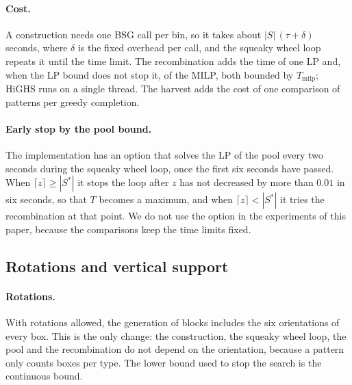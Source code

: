 \paragraph{Cost.}
A construction needs one BSG call per bin, so it takes about $|S|\,(\tau+\delta)$ seconds, where
$\delta$ is the fixed overhead per call, and the squeaky wheel loop repeats it until the time
limit. The recombination adds the time of one LP and, when the LP bound does not stop it, of the
MILP, both bounded by $T_{\mathrm{milp}}$; HiGHS \citep{Huangfu2018} runs on a single thread.
The harvest adds the cost of one comparison of patterns per greedy completion.

\paragraph{Early stop by the pool bound.}
The implementation has an option that solves the LP of the pool every two seconds during the
squeaky wheel loop, once the first six seconds have passed. When $\lceil z\rceil\ge|S^*|$ it stops
the loop after $z$ has not decreased by more than $0.01$ in six seconds, so that $T$ becomes a
maximum, and when $\lceil z\rceil<|S^*|$ it tries the recombination at that point. We do not use the option in
the experiments of this paper, because the comparisons keep the time limits fixed.

\subsection{Rotations and vertical support}
\label{sec:m-ext}

\paragraph{Rotations.}
With rotations allowed, the generation of blocks includes the six orientations of every box. This
is the only change: the construction, the squeaky wheel loop, the pool and the recombination do
not depend on the orientation, because a pattern only counts boxes per type. The lower bound
used to stop the search is the continuous bound.

